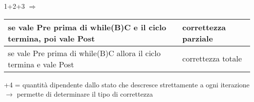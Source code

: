 \documentclass[12pt]{article}
\begin{document}
\begin{center}
    1+2+3 $\Rightarrow$
    \begin{tabular}{| m{20em} | m{5em} |}
        se  vale Pre prima di while(B)C e il ciclo termina, poi vale Post & correttezza parziale\\
        \hline
        se vale Pre prima di while(B)C allora il ciclo termina e vale Post & correttezza totale
    \end{tabular}
\end{center}
+4 = quantità dipendente dallo stato che descresce strettamente a ogni iterazione $\rightarrow$ permette di determinare il tipo di correttezza
\end{document}
